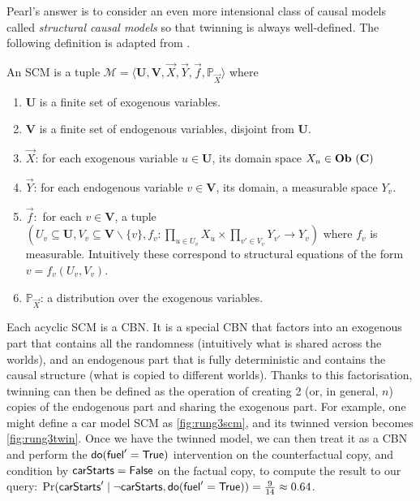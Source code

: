\documentclass[11pt,a4paper]{article}
\begin{document}
Pearl's answer is to consider an even more intensional class of causal models called \emph{structural causal models} \cite{pearl2009causality} so that twinning is always well-defined. The following definition is adapted from \cite{Bongers_2021}. 
\begin{definition}
    An SCM is a tuple $\mathcal{M} = \langle \mathbf{U}, \mathbf{V}, \vec{X}, \vec{Y}, \vec{f}, \mathbb{P}_{\vec{X}} \rangle$  where
\begin{enumerate}
    \item $\mathbf{U}$ is a finite set of exogenous variables.
    \item $\mathbf{V}$ is a finite set of endogenous variables, disjoint from $\mathbf{U}$.
    \item $\vec{X}$: for each exogenous variable $u \in \mathbf{U}$, its domain space $X_u \in \mathbf{Ob} \ (\mathbf{C})$
    \item $\vec{Y}$: for each endogenous variable $v \in \mathbf{V}$, its domain, a measurable space $Y_v$. 
    \item $\vec{f}:$ for each $v \in \mathbf{V}$, a tuple $(U_v \subseteq \mathbf{U}, V_v \subseteq \mathbf{V} \backslash \{v\}, f_v: \prod_{u \in U_v} X_u \times \prod_{v' \in V_v} Y_{v'} \to Y_v)$ where $f_v$ is measurable. Intuitively these correspond to structural equations of the form $v = f_v(U_v, V_v)$.
    \item $\mathbb{P}_{\vec{X}}$: a distribution over the exogenous variables.
\end{enumerate}
\end{definition}
Each acyclic SCM is a CBN. It is a special CBN that factors into an exogenous part that contains all the randomness (intuitively what is shared across the worlds), and an endogenous part that is fully deterministic and contains the causal structure (what is copied to different worlds). Thanks to this factorisation, twinning can then be defined as the operation of creating 2 (or, in general, $n$) copies of the endogenous part and sharing the exogenous part. For example, one might define a car model SCM as \cref{fig:rung3scm}, and its twinned version becomes \cref{fig:rung3twin}. Once we have the twinned model, we can then treat it as a CBN and perform the $\mathsf{do}(\mathsf{fuel}'=\mathsf{True})$ intervention on the counterfactual copy, and condition by $\mathsf{carStarts}=\mathsf{False}$ on the factual copy, to compute the result to our query: $\Pr(\textsf{carStarts}'\mid\neg\textsf{carStarts}, \mathsf{do}(\mathsf{fuel}'=\mathsf{True}))=\tfrac{9}{14}\approx0.64$. 
\end{document}
